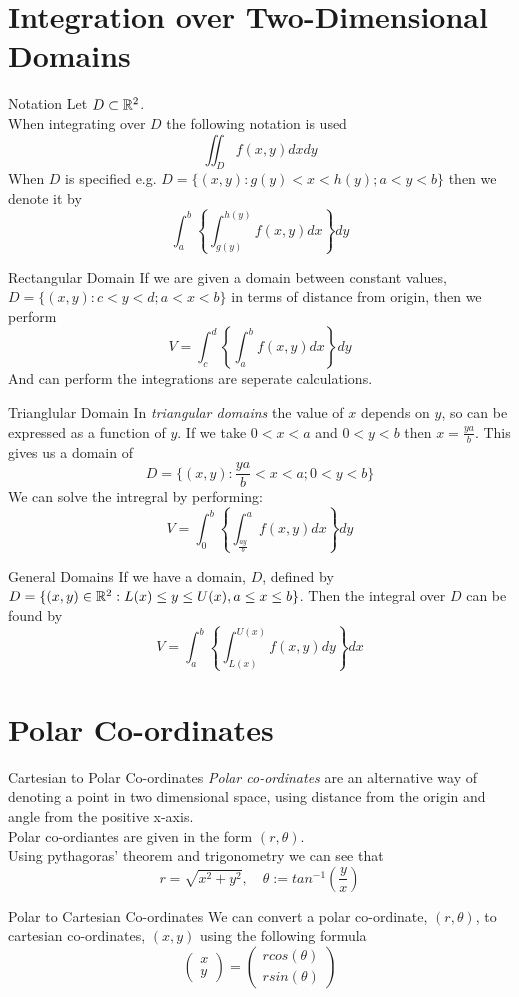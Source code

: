 \documentclass[11pt,a4paper]{article}
\begin{document}
\section{Integration over Two-Dimensional Domains}

\subtitle{Remark 12.01 - }{Notation}
Let $D \subset \mathbb{R}^2$.\\
When integrating over $D$ the following notation is used $$\iint_D f(x, y) dx dy$$
When $D$ is specified e.g. $D = \{(x, y) : g(y) < x < h(y); a < y < b\}$ then we denote it by $$\int_{a}^{b} \left\{\int_{g(y)}^{h(y)} f(x, y) dx \right\} dy$$

\subtitle{Theorem 12.02 - }{Rectangular Domain}
If we are given a domain between constant values, $D = \{(x, y) : c < y < d; a < x < b\}$ in terms of distance from origin, then we perform
$$V = \int_{c}^{d} \left\{\int_{a}^{b} f(x, y) dx \right\} dy$$
And can perform the integrations are seperate calculations.\\

\subtitle{Theorem 12.03 - }{Trianglular Domain}
In \textit{triangular domains} the value of $x$ depends on $y$, so can be expressed as a function of $y$. If we take $0 < x < a$ and $0 < y < b$ then $x = \frac{ya}{b}$.
This gives us a domain of $$D = \{(x, y): \frac{ya}{b} < x < a; 0 < y < b\}$$
We can solve the intregral by performing: $$V = \int_{0}^{b} \left\{ \int_{\frac{ay}{b}}^{a} f(x, y) dx \right\} dy$$

\subtitle{Theorem 12.04 - }{General Domains}
If we have a domain, $D$, defined by $D = \{(x, y) \in \mathbb{R}^2: L(x) \leq y \leq U(x), a \leq x \leq b\}$. Then the integral over $D$ can be found by
$$V=\int_{a}^{b} \left\{ \int_{L(x)}^{U(x)} f(x,y) dy \right\} dx$$

\section{Polar Co-ordinates}

\subtitle{Defintion 13.01 - }{Cartesian to Polar Co-ordinates}
\textit{Polar co-ordinates} are an alternative way of denoting a point in two dimensional space, using distance from the origin and angle from the positive x-axis.\\
Polar co-ordiantes are given in the form $(r, \theta)$.\\
Using pythagoras' theorem and trigonometry we can see that
$$r = \sqrt{x^2 + y^2},\quad \theta := tan^{-1}\left(\frac{y}{x}\right)$$

\subtitle{Theorem 13.02 - }{Polar to Cartesian Co-ordinates}
We can convert a polar co-ordinate, $(r, \theta)$, to cartesian co-ordinates, $(x, y)$ using the following formula
$$\begin{pmatrix} x \\ y \end{pmatrix} = \begin{pmatrix} rcos(\theta) \\ rsin(\theta) \end{pmatrix}$$
\end{document}
